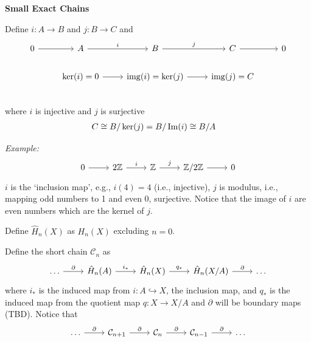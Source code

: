 \documentclass[12pt,a4paper]{report}
\newcommand{\IMG}{\operatorname{img}}
\begin{document}
\begin{description}
\item \textbf{Small Exact Chains}

Define $i: A \to B$ and $j: B \to C$ and 
\[\begin{tikzcd}
	0 \arrow[r] & A \arrow[r,"i"] & B \arrow[r, "j"] & C \arrow[r] & 0 \\
	 & \ker(i)=0 \arrow[r] & \IMG(i)=\ker(j) \arrow[r] & \IMG(j)=C \\
\end{tikzcd}\]where $i$ is injective and $j$ is surjective
\begin{align*}
	C \cong B/\ker(j) &= B/\operatorname{Im}(i) \cong B/A
\end{align*}

\textit{Example:}
\[\begin{tikzcd}
	0 \arrow[r] & 2\Z \arrow[r,"i"] & \Z \arrow[r, "j"] & \Z/2\Z \arrow[r] & 0 
\end{tikzcd}\] $i$ is the `inclusion map', e.g., $i(4) = 4$ (i.e., injective), $j$ is modulus, i.e., mapping odd numbers to 1 and even 0, surjective.  Notice that the image of $i$ are even numbers which are the kernel of $j$.

\begin{definition}

Define $\hat{H}_n(X)$ as $H_n(X)$ excluding $n=0$.
\end{definition}

\begin{theorem}

Define the short chain $\mathcal{C}_n$ as
\[\begin{tikzcd}
	\dots \arrow[r, "\partial"] & \hat{H}_n(A) \arrow[r,"i_*"] & \hat{H}_n(X) \arrow[r, "q_*"] & \hat{H}_n(X/A) \arrow[r,"\partial"] & \dots
\end{tikzcd}\]where $i_*$ is the induced map from $i: A \hookrightarrow X$, the inclusion map, and $q_*$ is the induced map from the quotient map $q: X \to X/A$ and $\partial$ will be boundary maps (TBD).  Notice that
\[\begin{tikzcd}
	\dots \arrow[r, "\partial"] & \mathcal{C}_{n+1} \arrow[r,"\partial"] & \mathcal{C}_{n} \arrow[r, "\partial"] & \mathcal{C}_{n-1} \arrow[r,"\partial"] & \dots
\end{tikzcd}\]
\end{theorem}


\end{description}
\end{document}
